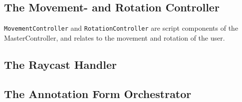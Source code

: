 \subsection{The Movement- and Rotation Controller}
\texttt{MovementController} and \texttt{RotationController} are script components of the MasterController, and relates to the movement and rotation of the user.

\subsection{The Raycast Handler}

\subsection{The Annotation Form Orchestrator}
